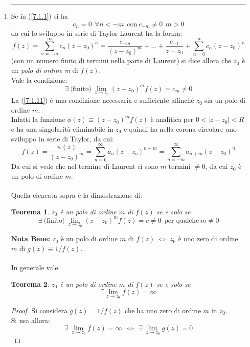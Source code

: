 \documentclass[twoside]{article}
\newtheorem{theorem}{Teorema}[section]
\begin{document}
\begin{enumerate}
    
    \item 
    \rule{\textwidth}{0.7pt}
    Se in (\ref{7.1.1}) si ha
    \begin{equation}
        c_n=0 \ \ \forall n<-m \ \ \text{con} \ c_{-m}\ne 0 \ \ m>0
    \end{equation}
    da cui lo sviluppo in serie di Taylor-Laurent ha la forma:
    \begin{equation}
        f(z)=\sum_{n=-m}^{\infty}c_n(z-z_0)^n=\frac{c_{-m}}{(z-z_0)^m}+...+\frac{c_{-1}}{z-z_0}+\sum_{n=0}^{\infty}c_n(z-z_0)^n
    \end{equation}
    (con un numero finito di termini nella parte di Laurent) si dice allora che $z_0$ è un \textit{polo di ordine m} di $f(z)$.
    \\
    Vale la condizione:
    \begin{equation} \label{7.1.11}
        \exists \ \text{(finito)} \ \lim_{z \to z_0} (z-z_0)^m f(z)=c_m \ne 0
    \end{equation}
    La (\ref{7.1.11}) è una condizione necessaria e sufficiente affinchè $z_0$ sia un polo di ordine $m$.
    \\
    Infatti la funzione $\phi(z)\equiv (z-z_0)^m f(z)$ è analitica per $0<|z-z_0|<R$ e ha una singolarità eliminabile in $z_0$ e quindi ha nella corona circolare uno sviluppo in serie di Taylor, da cui:
    \begin{equation}
        f(z)=\frac{\psi(z)}{(z-z_0)^m}=\sum_{n=0}^{\infty}a_n(z-z_o)^{n-m}=\sum_{n=-m}^{\infty} a_{n+m}(z-z_0)^{n}
    \end{equation}
    Da cui si vede che nel termine di Laurent ci sono $m$ termini $\ne 0$, da cui $z_0$ è un polo di ordine $m$.
    \\ \\
    Quella elencata sopra è la dimostrazione di:
    \begin{theorem}
    $z_0$ è un polo di ordine $m$ di $f(z)$ se e solo se
    \begin{equation}
        \exists \ \text{(finito)} \ \lim_{z \to z_0}(z-z_0)^m f(z)=c\ne 0 \ \ \text{per qualche} \ m \ne 0
    \end{equation}
    \end{theorem}
    \textbf{Nota Bene:} $z_0$ è un polo di ordine $m$ di $f(z)$ $\iff$ $z_0$ è uno zero di ordine $m$ di $g(z)\equiv 1/f(z)$.
    \\ \\
    In generale vale:
     \begin{theorem}
     $z_0$ è un polo di ordine $m$ di $f(z)$ se e solo se
     \begin{equation}
         \exists \lim_{z \to z_0}f(z)=\infty
     \end{equation}
     \end{theorem}
     \begin{proof}
     Si considera $g(z)=1/f(z)$ che ha uno zero di ordine $m$ in $z_0$.
     \\
     Si usa allora:
     \begin{equation}
         \exists \ \lim_{z\to z_0}f(z)=\infty \ \ \iff \ \ \exists \ \lim_{z\to z_0} g(z)=0
     \end{equation}
     

\end{proof}
\end{enumerate}
\end{document}
